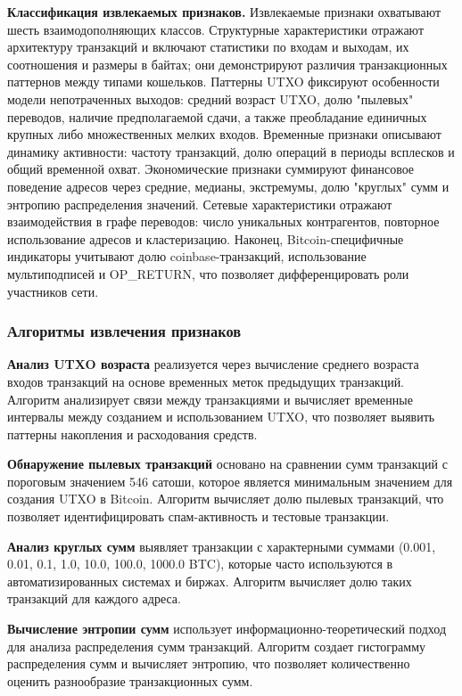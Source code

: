 \textbf{Классификация извлекаемых признаков.}
Извлекаемые признаки охватывают шесть взаимодополняющих классов. Структурные характеристики отражают архитектуру транзакций и включают статистики по входам и выходам, их соотношения и размеры в байтах; они демонстрируют различия транзакционных паттернов между типами кошельков. Паттерны UTXO фиксируют особенности модели непотраченных выходов: средний возраст UTXO, долю "пылевых" переводов, наличие предполагаемой сдачи, а также преобладание единичных крупных либо множественных мелких входов. Временные признаки описывают динамику активности: частоту транзакций, долю операций в периоды всплесков и общий временной охват. Экономические признаки суммируют финансовое поведение адресов через средние, медианы, экстремумы, долю "круглых" сумм и энтропию распределения значений. Сетевые характеристики отражают взаимодействия в графе переводов: число уникальных контрагентов, повторное использование адресов и кластеризацию. Наконец, Bitcoin-специфичные индикаторы учитывают долю coinbase-транзакций, использование мультиподписей и OP\_RETURN, что позволяет дифференцировать роли участников сети.

\subsubsection{Алгоритмы извлечения признаков}

\textbf{Анализ UTXO возраста} реализуется через вычисление среднего возраста входов транзакций на основе временных меток предыдущих транзакций. Алгоритм анализирует связи между транзакциями и вычисляет временные интервалы между созданием и использованием UTXO, что позволяет выявить паттерны накопления и расходования средств.

\textbf{Обнаружение пылевых транзакций} основано на сравнении сумм транзакций с пороговым значением 546 сатоши, которое является минимальным значением для создания UTXO в Bitcoin. Алгоритм вычисляет долю пылевых транзакций, что позволяет идентифицировать спам-активность и тестовые транзакции.

\textbf{Анализ круглых сумм} выявляет транзакции с характерными суммами (0.001, 0.01, 0.1, 1.0, 10.0, 100.0, 1000.0 BTC), которые часто используются в автоматизированных системах и биржах. Алгоритм вычисляет долю таких транзакций для каждого адреса.

\textbf{Вычисление энтропии сумм} использует информационно-теоретический подход для анализа распределения сумм транзакций. Алгоритм создает гистограмму распределения сумм и вычисляет энтропию, что позволяет количественно оценить разнообразие транзакционных сумм.

